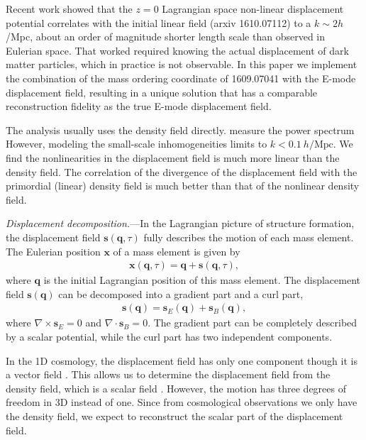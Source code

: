 \documentclass[aps,prd,twocolumn,superscriptaddress,groupedaddress,nofootinbib]{revtex4}  %
\newcommand{\mr}{\mathrm}
\newcommand{\bea}{\begin{eqnarray}}
\newcommand{\eea}{\end{eqnarray}}
\begin{document}
Recent work showed that the $z=0$ Lagrangian space non-linear
displacement potential correlates with the initial linear field (arxiv
1610.07112) to a $k\sim 2h$/Mpc, about an order of magnitude shorter
length scale than observed in Eulerian space.  That worked required
knowing the actual displacement of dark matter particles, which in
practice is not observable.  In this paper we implement the
combination of the mass ordering coordinate of 1609.07041 with the
E-mode displacement field, resulting in a unique solution that has a
comparable reconstruction fidelity as the true E-mode displacement field.

The analysis usually uses the density field directly. measure the power spectrum
However, modeling the small-scale inhomogeneities limits to $k<0.1\ h/\mr{Mpc}$.
We find the nonlinearities in the displacement field is much more linear than 
the density field. The correlation of the divergence of the displacement field
with the primordial (linear) density field is much better than that of the 
nonlinear density field. 

{\it Displacement decomposition.}---In the Lagrangian picture of structure 
formation, 
the displacement field $\bm{s}(\bm{q},\tau)$ fully describes the motion of each mass element. The Eulerian position $\bm{x}$ of a mass element is given by
\bea
\bm{x}(\bm{q},\tau)=\bm{q}+\bm{s}(\bm{q},\tau),
\eea
where $\bm{q}$ is the initial Lagrangian position of this mass element.
The displacement field $\bm{s}(\bm{q})$ can be decomposed into a gradient part
and a curl part,
\bea
\bm{s}(\bm{q})=\bm{s}_E(\bm{q})+\bm{s}_B(\bm{q}),
\eea
where $\nabla\times\bm{s}_E=0$ and $\nabla\cdot\bm{s}_B=0$.
The gradient part can be completely described by a scalar potential,
while the curl part has two independent components.

In the 1D cosmology, the displacement field has only one component though 
it is a vector field \cite{2016matt}. 
This allows us to determine the displacement field 
from the density field, which is a scalar field \cite{2016arXiv160907041Z}.
However, the motion has three degrees of freedom in 3D instead of one.
Since from cosmological observations we only have the density field, we expect 
to reconstruct the scalar part of the displacement field.

\end{document}
